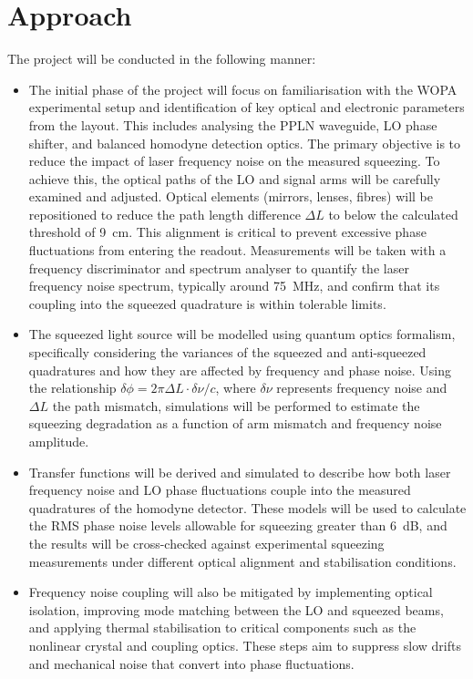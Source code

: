 \documentclass[colorlinks=true,pdfstartview=FitV,linkcolor=blue,
citecolor=red,urlcolor=magenta]{ligodoc}
\begin{document}
\section{Approach}
The project will be conducted in the following manner:
\begin{itemize}
    \item The initial phase of the project will focus on familiarisation with the WOPA experimental setup and identification of key optical and electronic parameters from the layout. This includes analysing the PPLN waveguide, LO phase shifter, and balanced homodyne detection optics. The primary objective is to reduce the impact of laser frequency noise on the measured squeezing. To achieve this, the optical paths of the LO and signal arms will be carefully examined and adjusted. Optical elements (mirrors, lenses, fibres) will be repositioned to reduce the path length difference $\Delta L$ to below the calculated threshold of 9~cm. This alignment is critical to prevent excessive phase fluctuations from entering the readout. Measurements will be taken with a frequency discriminator and spectrum analyser to quantify the laser frequency noise spectrum, typically around 75~MHz, and confirm that its coupling into the squeezed quadrature is within tolerable limits.

    \item The squeezed light source will be modelled using quantum optics formalism, specifically considering the variances of the squeezed and anti-squeezed quadratures and how they are affected by frequency and phase noise. Using the relationship $\delta \phi = 2\pi \Delta L \cdot \delta \nu / c$, where $\delta \nu$ represents frequency noise and $\Delta L$ the path mismatch, simulations will be performed to estimate the squeezing degradation as a function of arm mismatch and frequency noise amplitude.

    \item Transfer functions will be derived and simulated to describe how both laser frequency noise and LO phase fluctuations couple into the measured quadratures of the homodyne detector. These models will be used to calculate the RMS phase noise levels allowable for squeezing greater than 6~dB, and the results will be cross-checked against experimental squeezing measurements under different optical alignment and stabilisation conditions.

    \item Frequency noise coupling will also be mitigated by implementing optical isolation, improving mode matching between the LO and squeezed beams, and applying thermal stabilisation to critical components such as the nonlinear crystal and coupling optics. These steps aim to suppress slow drifts and mechanical noise that convert into phase fluctuations.


\end{itemize}
\end{document}
